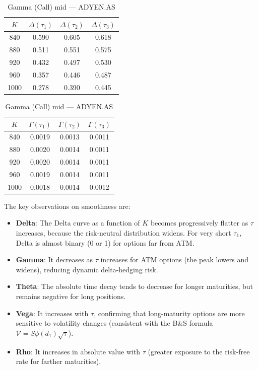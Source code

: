 \documentclass{report}
\begin{document}
\begin{table}[H]
\centering
\begin{minipage}[t]{0.48\textwidth}
\centering
\caption{Delta (Call) mid — ADYEN.AS}
\begin{tabular}{cccc}
\toprule
$K$ & $\Delta(\tau_1)$ & $\Delta(\tau_2)$ & $\Delta(\tau_3)$ \\
\midrule
840  & 0.590 & 0.605 & 0.618 \\
880  & 0.511 & 0.551 & 0.575 \\
920  & 0.432 & 0.497 & 0.530 \\
960  & 0.357 & 0.446 & 0.487 \\
1000 & 0.278 & 0.390 & 0.445 \\
\bottomrule
\end{tabular}
\end{minipage}
\hfill
\begin{minipage}[t]{0.48\textwidth}
\centering
\caption{Gamma (Call) mid — ADYEN.AS}
\begin{tabular}{cccc}
\toprule
$K$ & $\Gamma(\tau_1)$ & $\Gamma(\tau_2)$ & $\Gamma(\tau_3)$ \\
\midrule
840  & 0.0019 & 0.0013 & 0.0011 \\
880  & 0.0020 & 0.0014 & 0.0011 \\
920  & 0.0020 & 0.0014 & 0.0011 \\
960  & 0.0019 & 0.0014 & 0.0011 \\
1000 & 0.0018 & 0.0014 & 0.0012 \\
\bottomrule
\end{tabular}
\end{minipage}
\end{table}
 
The key observations on smoothness are:
 
\begin{itemize}
  \item \textbf{Delta}: The Delta curve as a function of $K$ becomes progressively
        flatter as $\tau$ increases, because the risk-neutral distribution widens. For
        very short $\tau_1$, Delta is almost binary (0 or 1) for options far from ATM.
  \item \textbf{Gamma}: It decreases as $\tau$ increases for ATM options (the peak
        lowers and widens), reducing dynamic delta-hedging risk.
  \item \textbf{Theta}: The absolute time decay tends to decrease for longer maturities,
        but remains negative for long positions.
  \item \textbf{Vega}: It increases with $\tau$, confirming that long-maturity options
        are more sensitive to volatility changes (consistent with the B\&S formula
        $\mathcal{V} = S\phi(d_1)\sqrt{\tau}$).
  \item \textbf{Rho}: It increases in absolute value with $\tau$ (greater exposure to
        the risk-free rate for farther maturities).
\end{itemize}
\end{document}
